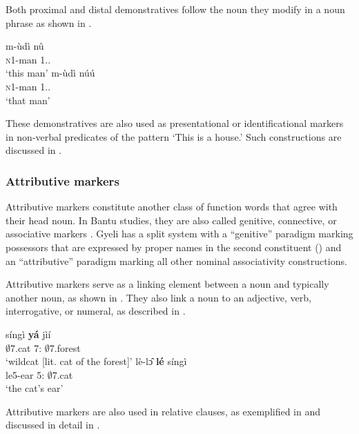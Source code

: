 \noindent Both proximal and distal demonstratives follow the noun they modify in a noun phrase as shown in .

\ea \label{DEM}
  \ea  \label{DEM1}
  \gll     m-ùdì nû \\
                \textsc{n}1-man 1.{\DEM}.{\PROX} \\
    \trans `this man'
\ex\label{DEM2}
 \gll     m-ùdì núú \\
                \textsc{n}1-man 1.{\DEM}.{\DIST} \\
    \trans `that man'
\z
\z

These demonstratives are also used as presentational or identificational markers in non-verbal predicates of the pattern `This is a house.' Such constructions are discussed in .





\subsubsection{Attributive markers}
\label{sec:ATT}

Attributive markers constitute another class of function words that agree with their head noun. In Bantu studies, they are also called genitive, connective, or associative markers \citep{velde2013}. Gyeli has a split system with a ``genitive'' paradigm marking possessors that are expressed by proper names in the second constituent () and an ``attributive'' paradigm marking all other nominal associativity constructions. 


Attributive markers serve as a linking element between a noun and typically another noun, as shown in . They also link a noun to an adjective, verb, interrogative, or numeral, as described in . 

\ea \label{CONM}
  \ea  \label{CONM1}
  \gll     síngì {\bfseries yá} jìí \\
                $\emptyset$7.cat 7:{\ATT} $\emptyset$7.forest \\
    \trans `wildcat [lit. cat of the forest]'
\ex\label{CONM2}
 \gll    lè-lɔ̂ {\bfseries lé} síngì \\
                le5-ear 5:{\ATT} $\emptyset$7.cat \\
    \trans `the cat's ear'
\z
\z

Attributive markers are also used in relative clauses, as exemplified in  and discussed in detail in .

